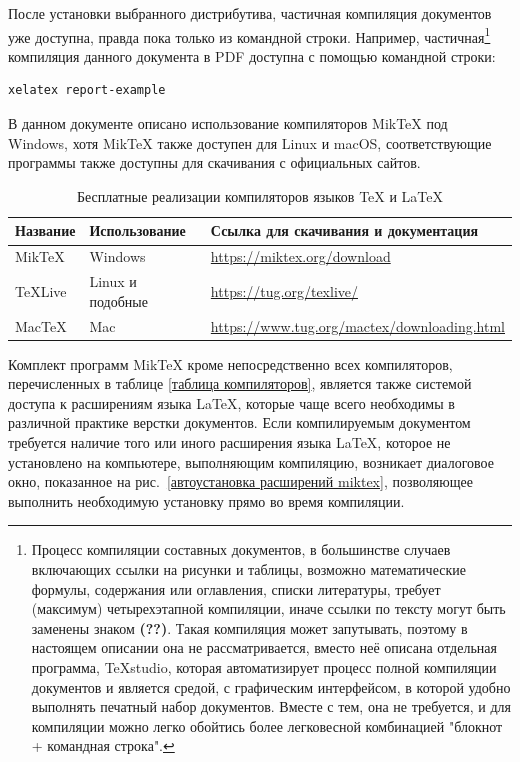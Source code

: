 \documentclass[workbook]{fefudoc}
\begin{document}
После установки выбранного дистрибутива, частичная компиляция документов уже доступна, правда пока только из командной строки.
Например,
частичная\footnote{Процесс компиляции составных документов, в большинстве случаев включающих ссылки на рисунки и таблицы, возможно математические формулы, содержания или оглавления, списки литературы, требует (максимум) четырехэтапной компиляции, иначе ссылки по тексту могут быть заменены знаком \textbf{(??)}. Такая компиляция может запутывать, поэтому в настоящем описании она не рассматривается, вместо неё описана отдельная программа, TeXstudio, которая автоматизирует процесс полной компиляции документов и является средой, с графическим интерфейсом, в которой удобно выполнять печатный набор документов. Вместе с тем, она не требуется, и для компиляции можно легко обойтись более легковесной комбинацией "блокнот + командная строка".}
компиляция данного документа в PDF доступна с помощью командной строки:
\begin{lstlisting}
xelatex report-example
\end{lstlisting}

В данном документе описано использование компиляторов MikTeX под Windows, хотя MikTeX также доступен для Linux и macOS, соответствующие программы также доступны для скачивания с официальных сайтов.

\begin{table}[ht]\small
\centering
\caption{Бесплатные реализации компиляторов языков \TeX{} и \LaTeX{}}
\label{таблица дистрибутивов}
\begin{tabularx}{\textwidth}{|l|l|X|}
\hline
\textbf{Название} & \textbf{Использование} & \textbf{Ссылка для скачивания и документация}     \\ \hline
MikTeX            & Windows                & \url{https://miktex.org/download}                 \\ \hline
TeXLive           & Linux и подобные       & \url{https://tug.org/texlive/}                    \\ \hline
MacTeX            & Mac                    & \url{https://www.tug.org/mactex/downloading.html} \\ \hline
\end{tabularx}
\end{table}

Комплект программ MikTeX кроме непосредственно всех компиляторов, перечисленных в таблице \ref{таблица компиляторов}, является также системой доступа к расширениям языка \LaTeX{}, которые чаще всего необходимы в различной практике верстки документов.
Если компилируемым документом требуется наличие того или иного расширения языка \LaTeX, которое не установлено на компьютере, выполняющим компиляцию, возникает диалоговое окно, показанное на рис.~\ref{автоустановка расширений miktex}, позволяющее выполнить необходимую установку прямо во время компиляции.
\end{document}
